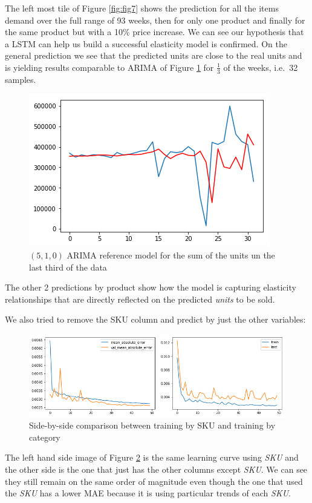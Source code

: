 \documentclass[]{article}
\theoremstyle{definition}
\theoremstyle{definition}
\theoremstyle{definition}
\theoremstyle{remark}
\begin{document}
The left most tile of Figure \ref{fig:fig7} shows the prediction for all
the items demand over the full range of 93 weeks, then for only one
product and finally for the same product but with a 10\% price increase.
We can see our hypothesis that a LSTM can help us build a successful
elasticity model is confirmed. On the general prediction we see that the
predicted units are close to the real units and is yielding results
comparable to ARIMA of Figure \ref{fig:fig8} for \(\frac{1}{3}\) of the
weeks, i.e.~32 samples.

\begin{figure}

{\centering \includegraphics[width=0.3\linewidth]{./media/arima2} 

}

\caption{$(5,1,0)$ ARIMA reference model for the sum of the units un the last third of the data}\label{fig:fig8}
\end{figure}

The other 2 predictions by product show how the model is capturing
elasticity relationships that are directly reflected on the predicted
\emph{units} to be sold.

We also tried to remove the SKU column and predict by just the other
variables:

\begin{figure}

{\centering \includegraphics[width=0.7\linewidth]{./media/side_cat} 

}

\caption{Side-by-side comparison between training by SKU and training by category}\label{fig:fig9}
\end{figure}

The left hand side image of Figure \ref{fig:fig9} is the same learning
curve using \emph{SKU} and the other side is the one that just has the
other columns except \emph{SKU}. We can see they still remain on the
same order of magnitude even though the one that used the \emph{SKU} has
a lower MAE because it is using particular trends of each \emph{SKU}.
\end{document}
